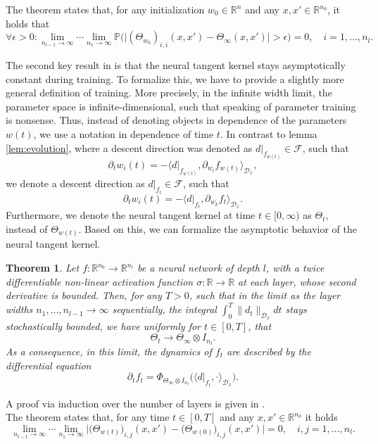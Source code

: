 \documentclass[11pt, a4paper]{article}
\newtheorem{theorem}{Theorem}[section]
\newcommand{\R}{\mathbb{R}}
\newcommand{\D}{\mathcal{D}}
\newcommand{\F}{\mathcal{F}}
\begin{document}
The theorem states that, for any initialization $w_0 \in \R^n$ and any  $x,x' \in \R^{n_0}$, it holds that
\[ \forall \epsilon > 0 : \lim_{n_{l-1} \to \infty} \cdots \lim_{n_1 \to \infty} \mathbb{P} \Big ( \big | (\Theta_{w_0})_{i,i}(x,x') - \Theta_{\infty}(x,x') \big | > \epsilon \Big ) = 0, \quad i=1, \dots, n_l. \]

The second key result in \cite{NTK} is that the neural tangent kernel stays asymptotically constant during training. To formalize this, we have to provide a slightly more general definition of training. More precisely, in the infinite width limit, the parameter space is infinite-dimensional, such that speaking of parameter training is nonsense. Thus, instead of denoting objects in dependence of the parameters $w(t)$, we use a notation in dependence of time $t$. In contrast to lemma \ref{lem:evolution}, where a descent direction was denoted as $d|_{f_{w(t)}} \in \F$, such that 
\[ \partial_tw_i(t) = - \big \langle d|_{f_{w(t)}}, \partial_{w_i} f_{w(t)} \big \rangle_{\D_x}, \]
we denote a descent direction as $d|_{f_t} \in \F$, such that
\[ \partial_tw_i(t) = - \big \langle d|_{f_t}, \partial_{w_k} f_t \big \rangle_{\D_x}. \]
Furthermore, we denote the neural tangent kernel at time $t \in [0, \infty)$ as $\Theta_t$, instead of $\Theta_{w(t)}$. Based on this, we can formalize the asymptotic behavior of the neural tangent kernel.

\begin{theorem} \label{thm:ntk}
Let $f: \R^{n_0} \to \R^{n_l}$ be a neural network of depth $l$, with a twice differentiable non-linear activation function $\sigma : \R \to \R$ at each layer, whose second derivative is bounded. Then, for any $T>0$, such that in the limit as the layer widths $n_1, \dots, n_{l-1} \to \infty$ sequentially, the integral $\int_{0}^{T} \| d_t \|_{\D_x}dt$ stays stochastically bounded, we have uniformly for $t \in [0,T]$, that
\[ \Theta_t \to \Theta_{\infty} \otimes I_{n_l}. \]
As a consequence, in this limit, the dynamics of $f_t$ are described by the differential equation
\[ \partial_tf_t = \Phi_{\Theta_{\infty} \otimes I_{n_l}} \Big ( \big \langle d|_{f_t}, \cdot \big \rangle_{\D_x} \Big ). \]
\end{theorem}

A proof via induction over the number of layers is given in \cite{NTK}. \\

The theorem states that, for any time $t \in [0,T]$ and any $x,x' \in \R^{n_0}$ it holds
\[ \lim_{n_{l-1} \to \infty} \cdots \lim_{n_1 \to \infty} \Big | \big (\Theta_{w(t)} \big )_{i,j}(x,x') - \big (\Theta_{w(0)} \big )_{i,j}(x,x') \Big | = 0, \quad i,j=1,\dots,n_l. \]
\end{document}
